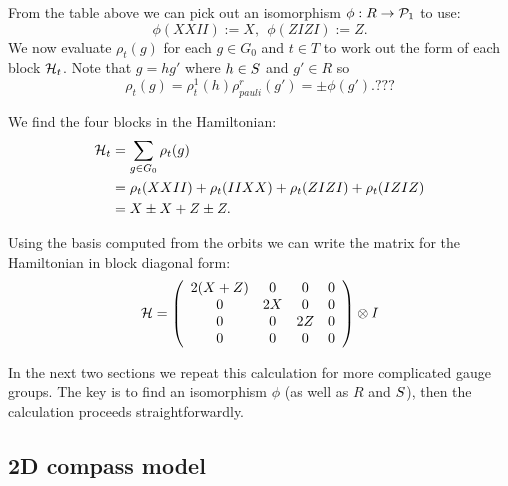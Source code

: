 \documentclass[12pt]{article}
\begin{document}
From the table above we can pick out an isomorphism $\phi:R\to \mathcal{P}_1$
to use: %
$$
    \phi(XXII) := X, \ \ \phi(ZIZI) := Z.
$$
We now evaluate $\rho_t(g)$ for each $g\in G_0$ and $t\in T$ 
to work out the form of each block $\mathcal{H}_t$.
Note that $g=hg'$ where $h\in S$ and $g'\in R$ 
so 
$$
\rho_t(g)=\rho^1_t(h)\rho^r_{pauli}(g')=\pm\phi(g'). \mbox{???}
$$

We find the four blocks in the Hamiltonian:
\begin{align*}
\mathcal{H}_t &= \sum_{g\in G_0} \rho_t(g) \\
    &= \rho_t(XXII) + \rho_t(IIXX) + \rho_t(ZIZI) + \rho_t(IZIZ) \\
    &= X \pm X + Z \pm Z.
\end{align*}

Using the basis computed from the orbits we
can write the matrix for the Hamiltonian in
block diagonal form:
$$
\mathcal{H} = 
\left( \begin{array}{cccc}
2(X+Z) & 0 & 0 & 0 \\
0  & 2X & 0 & 0 \\
0  & 0 & 2Z & 0 \\
0  & 0 & 0 & 0 \\
\end{array} \right) \otimes I
$$

In the next two sections we repeat this calculation for
more complicated gauge groups.
The key is to find an isomorphism $\phi$ (as well as $R$ and $S$),
then the calculation proceeds straightforwardly.

%
%

\subsection{2D compass model}
\end{document}
